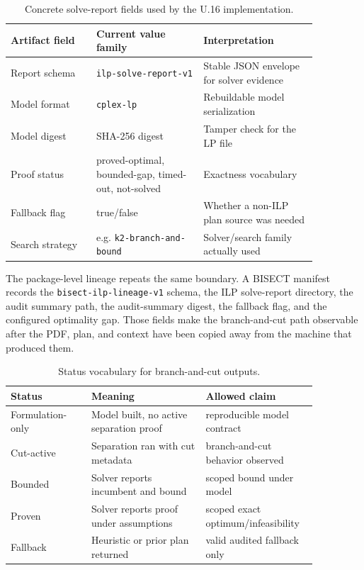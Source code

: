 \begin{table}[htbp]
\centering
\small
\begin{tabular}{p{0.24\linewidth}p{0.30\linewidth}p{0.32\linewidth}}
\toprule
Artifact field & Current value family & Interpretation \\
\midrule
Report schema & \texttt{ilp-solve-report-v1} & Stable JSON envelope for solver evidence \\
Model format & \texttt{cplex-lp} & Rebuildable model serialization \\
Model digest & SHA-256 digest & Tamper check for the LP file \\
Proof status & proved-optimal, bounded-gap, timed-out, not-solved & Exactness vocabulary \\
Fallback flag & true/false & Whether a non-ILP plan source was needed \\
Search strategy & e.g. \texttt{k2-branch-and-bound} & Solver/search family actually used \\
\bottomrule
\end{tabular}
\caption{Concrete solve-report fields used by the U.16 implementation.}
\end{table}

The package-level lineage repeats the same boundary. A BISECT manifest records
the \texttt{bisect-ilp-lineage-v1} schema, the ILP solve-report directory, the
audit summary path, the audit-summary digest, the fallback flag, and the
configured optimality gap. Those fields make the branch-and-cut path observable
after the PDF, plan, and context have been copied away from the machine that
produced them.

\begin{table}[htbp]
\centering
\small
\begin{tabular}{p{0.24\linewidth}p{0.34\linewidth}p{0.28\linewidth}}
\toprule
Status & Meaning & Allowed claim \\
\midrule
Formulation-only & Model built, no active separation proof & reproducible model contract \\
Cut-active & Separation ran with cut metadata & branch-and-cut behavior observed \\
Bounded & Solver reports incumbent and bound & scoped bound under model \\
Proven & Solver reports proof under assumptions & scoped exact optimum/infeasibility \\
Fallback & Heuristic or prior plan returned & valid audited fallback only \\
\bottomrule
\end{tabular}
\caption{Status vocabulary for branch-and-cut outputs.}
\end{table}
